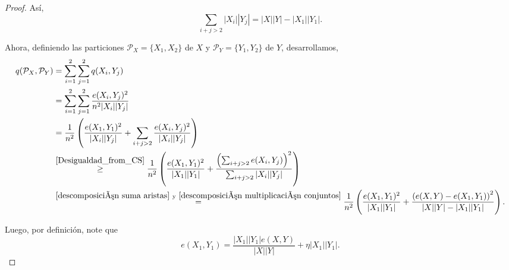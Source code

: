 \documentclass{article}[14pts]
\begin{document}
\begin{proof}
    Así,
    \begin{equation} \label{descomposición multiplicación conjuntos}
        \sum_{i+j > 2} |X_i||Y_j| = |X||Y| - |X_1||Y_1| .
    \end{equation}

    Ahora, definiendo las particiones $\mathcal{P}_{X} = \lbrace X_1, X_2\rbrace$ de $X$ y $\mathcal{P}_{Y} = \lbrace Y_1, Y_2\rbrace$ de $Y$, desarrollamos,
    \begin{align} \label{Primer cálculo energy boost}
        q(\mathcal{P}_{X}, \mathcal{P}_{Y}) &= \sum_{i=1}^{2}\sum_{j=1}^{2} q(X_i, Y_j) \nonumber\\
        &= \sum_{i=1}^{2}\sum_{j=1}^{2} \frac{e(X_i, Y_j)^{2}}{n^{2}|X_i||Y_j|} \nonumber\\
        &= \frac{1}{n^{2}}\left( \frac{e(X_1, Y_1)^{2}}{|X_i||Y_j|} + \sum_{i+j > 2} \frac{e(X_i, Y_j)^{2}}{|X_i||Y_j|}\right) \nonumber\\
        &\overset{\eqref{Desigualdad_from_CS}}{\geq} \frac{1}{n^{2}}\left( \frac{e(X_1, Y_1)^{2}}{|X_1||Y_1|} + \frac{\left( \sum_{i+j > 2} e(X_i, Y_j)\right)^{2}}{\sum_{i+j > 2} |X_i||Y_j|}\right) \nonumber\\
        &\overset{\eqref{descomposición suma aristas}\ \text{y}\ \eqref{descomposición multiplicación conjuntos}}{=} \frac{1}{n^{2}}\left( \frac{e(X_1, Y_1)^{2}}{|X_1||Y_1|} + \frac{\left( e(X,Y) - e(X_1, Y_1)\right)^{2}}{|X||Y| - |X_1||Y_1|}\right).
    \end{align}

    Luego, por definición, note que
    \begin{equation} \label{e(X_1,Y_1) = ...}
        e(X_1, Y_1) = \frac{|X_1||Y_1| e(X,Y)}{|X||Y|} + \eta |X_1||Y_1|.
    \end{equation}


\end{proof}
\end{document}
